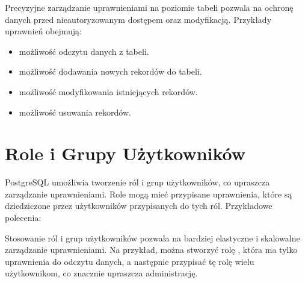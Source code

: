 \documentclass[letterpaper,10pt,polish]{sphinxmanual}
\begin{document}
\sphinxAtStartPar
Precyzyjne zarządzanie uprawnieniami na poziomie tabeli pozwala na
ochronę danych przed nieautoryzowanym dostępem oraz modyfikacją.
Przykłady uprawnień obejmują:
\begin{itemize}
\item {} 
\sphinxAtStartPar
{} \sphinxhyphen{} możliwość odczytu danych z tabeli.

\item {} 
\sphinxAtStartPar
{} \sphinxhyphen{} możliwość dodawania nowych rekordów do tabeli.

\item {} 
\sphinxAtStartPar
{} \sphinxhyphen{} możliwość modyfikowania istniejących rekordów.

\item {} 
\sphinxAtStartPar
{} \sphinxhyphen{} możliwość usuwania rekordów.

\end{itemize}


\section{Role i Grupy Użytkowników}
\label{\detokenize{sprawozdanie/source/rozdzialy/rozdzial2:role-i-grupy-uzytkownikow}}
\sphinxAtStartPar
PostgreSQL umożliwia tworzenie ról i grup użytkowników, co upraszcza
zarządzanie uprawnieniami. Role mogą mieć przypisane uprawnienia, które
są dziedziczone przez użytkowników przypisanych do tych ról. Przykładowe
polecenia:

\begin{sphinxVerbatim}[commandchars=\\\{\}]
  
         
   
\end{sphinxVerbatim}

\sphinxAtStartPar
Stosowanie ról i grup użytkowników pozwala na bardziej elastyczne i
skalowalne zarządzanie uprawnieniami. Na przykład, można stworzyć rolę
, która ma tylko uprawnienia do odczytu danych, a następnie
przypisać tę rolę wielu użytkownikom, co znacznie upraszcza
administrację.
\end{document}
